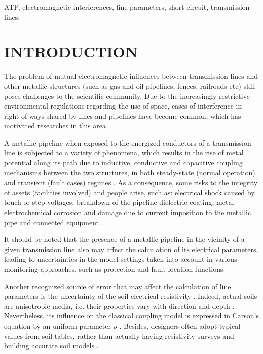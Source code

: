 \documentclass[conference]{IEEEtran}
\begin{document}
	\begin{IEEEkeywords}
		ATP, electromagnetic interferences, line parameters, short circuit, transmission lines.
	\end{IEEEkeywords}
	
	\section{INTRODUCTION}
	
	The problem of mutual electromagnetic influences between transmission lines and other metallic structures (such as gas and oil pipelines, fences, railroads etc) still poses challenges to the scientific community. Due to the increasingly restrictive environmental regulations regarding the use of space, cases of interference in right-of-ways shared by lines and pipelines have become common, which has motivated researches in this area \cite{CIGREWG36,Christoforidis2005}.
	
	A metallic pipeline when exposed to the energized conductors of a transmission line is subjected to a variety of phenomena, which results in the rise of metal potential along its path due to inductive, conductive and capacitive coupling mechanisms between the two structures, in both steady-state (normal operation) and transient (fault cases) regimes \cite{CIGREWG36,Christoforidis2005}. As a consequence, some risks to the integrity of assets (facilities involved) and people arise, such as: electrical shock caused by touch or step voltages, breakdown of the pipeline dielectric coating, metal electrochemical corrosion and damage due to current imposition to the metallic pipe and connected equipment \cite{CIGREWG36}. 
	
	It should be noted that the presence of a metallic pipeline in the vicinity of a given transmission line also may affect the calculation of its electrical parameters, leading to uncertainties in the model settings taken into account in various monitoring approaches, such as protection and fault location functions.
	
	Another recognized source of error that may affect the calculation of line parameters is the uncertainty of the soil electrical resistivity \cite{Das2014}. Indeed, actual soils are anisotropic media, i.e. their properties vary with direction and depth \cite{He2012}. Nevertheless, its influence on the classical coupling model is expressed in Carson's equation by an uniform parameter $\rho$ \cite{Carson1926}. Besides, designers often adopt typical values from soil tables, rather than actually having resistivity surveys and building accurate soil models \cite{Whelan2010}. 
	
\end{document}
